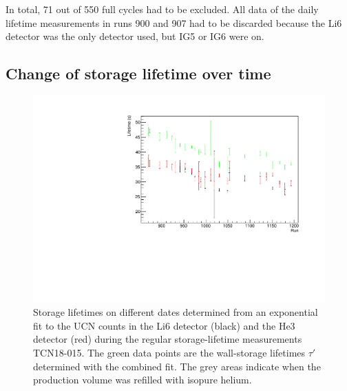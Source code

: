 \documentclass[10pt,letterpaper]{article}
\begin{document}
In total, 71 out of 550 full cycles had to be excluded. All data of the daily lifetime measurements in runs 900 and 907 had to be discarded because the Li6 detector was the only detector used, but IG5 or IG6 were on.

\subsection{Change of storage lifetime over time}

\begin{figure}
\centering
\includegraphics[width=\textwidth,page=2]{../storagelifetime/dailytau.pdf}
\caption{Storage lifetimes on different dates determined from an exponential fit to the UCN counts in the Li6 detector (black) and the He3 detector (red) during the regular storage-lifetime measurements TCN18-015. The green data points are the wall-storage lifetimes $\tau'$ determined with the combined fit. The grey areas indicate when the production volume was refilled with isopure helium.}
\label{fig:dailytau}
\end{figure}
\end{document}
